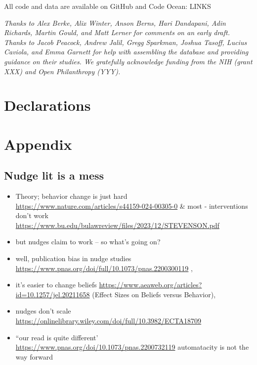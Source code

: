 \documentclass[sn-nature,pdflatex]{sn-jnl}
\begin{document}
\backmatter


All code and data are available on GitHub and Code Ocean: LINKS


\emph{Thanks to Alex Berke, Alix Winter, Anson Berns, Hari Dandapani,
Adin Richards, Martin Gould, and Matt Lerner for comments on an early
draft. Thanks to Jacob Peacock, Andrew Jalil, Gregg Sparkman, Joshua
Tasoff, Lucius Caviola, and Emma Garnett for help with assembling the
database and providing guidance on their studies. We gratefully
acknowledge funding from the NIH (grant XXX) and Open Philanthropy
(YYY).}

\section*{Declarations}\label{declarations}

\section{Appendix}\label{secA1}

\subsection{Nudge lit is a mess}\label{nudge-lit-is-a-mess}

\begin{itemize}
\item
  Theory; behavior change is just hard
  \url{https://www.nature.com/articles/s44159-024-00305-0} \& most -
  interventions don't work
  \url{https://www.bu.edu/bulawreview/files/2023/12/STEVENSON.pdf}
\item
  but nudges claim to work -- so what's going on?
\item
  well, publication bias in nudge studies
  \url{https://www.pnas.org/doi/full/10.1073/pnas.2200300119} ,
\item
  it's easier to change beliefs
  \url{https://www.aeaweb.org/articles?id=10.1257/jel.20211658} (Effect
  Sizes on Beliefs versus Behavior),
\item
  nudges don't scale
  \url{https://onlinelibrary.wiley.com/doi/full/10.3982/ECTA18709}
\item
  ``our read is quite different'
  \url{https://www.pnas.org/doi/10.1073/pnas.2200732119} automatacity is
  not the way forward
\end{itemize}

\renewcommand\refname{References}

\end{document}
